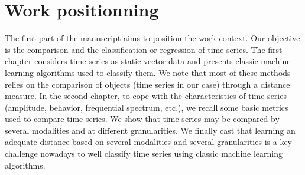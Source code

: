 \part{Work positionning}

The first part of the manuscript aims to position the work context. Our objective is the comparison and the classification or regression of time series. The first chapter considers time series as static vector data and presents classic machine learning algorithms used to classify them. We note that most of these methods relies on the comparison of objects (time series in our case) through a distance measure. In the second chapter, to cope with the characteristics of time series (amplitude, behavior, frequential spectrum, etc.), we recall some basic metrics used to compare time series. We show that time series may be compared by several modalities and at different granularities. We finally cast that learning an adequate distance based on several modalities and several granularities is a key challenge nowadays to well classify time series using classic machine learning algorithms.

